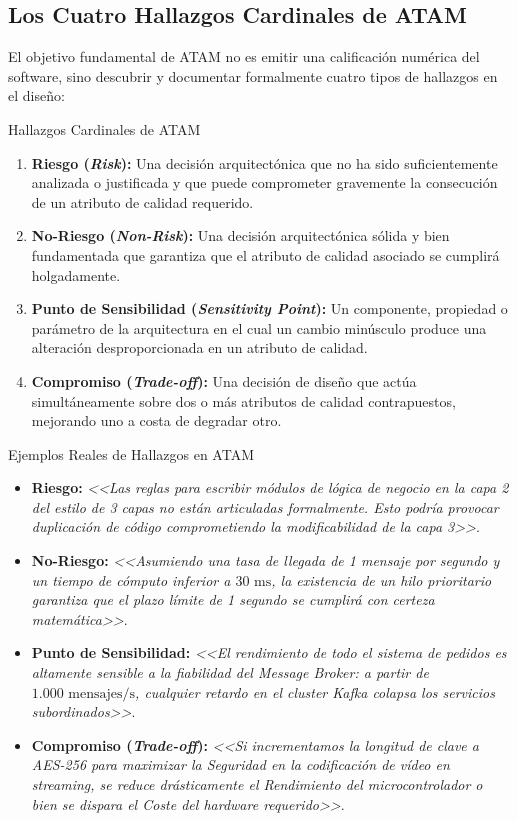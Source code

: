 \subsection{Los Cuatro Hallazgos Cardinales de ATAM}

El objetivo fundamental de ATAM no es emitir una calificación numérica del software, sino descubrir y documentar formalmente cuatro tipos de hallazgos en el diseño:

\begin{definicion}{Hallazgos Cardinales de ATAM}
\begin{enumerate}[leftmargin=1.5em]
  \item \textbf{Riesgo (\emph{Risk}):} Una decisión arquitectónica que no ha sido suficientemente analizada o justificada y que puede comprometer gravemente la consecución de un atributo de calidad requerido.
  \item \textbf{No-Riesgo (\emph{Non-Risk}):} Una decisión arquitectónica sólida y bien fundamentada que garantiza que el atributo de calidad asociado se cumplirá holgadamente.
  \item \textbf{Punto de Sensibilidad (\emph{Sensitivity Point}):} Un componente, propiedad o parámetro de la arquitectura en el cual un cambio minúsculo produce una alteración desproporcionada en un atributo de calidad.
  \item \textbf{Compromiso (\emph{Trade-off}):} Una decisión de diseño que actúa simultáneamente sobre dos o más atributos de calidad contrapuestos, mejorando uno a costa de degradar otro.
\end{enumerate}
\end{definicion}

\begin{ejemplo}{Ejemplos Reales de Hallazgos en ATAM}
\begin{itemize}[leftmargin=1.5em]
  \item \textbf{Riesgo:} \emph{<<Las reglas para escribir módulos de lógica de negocio en la capa 2 del estilo de 3 capas no están articuladas formalmente. Esto podría provocar duplicación de código comprometiendo la modificabilidad de la capa 3>>}.
  \item \textbf{No-Riesgo:} \emph{<<Asumiendo una tasa de llegada de 1 mensaje por segundo y un tiempo de cómputo inferior a $30\text{ ms}$, la existencia de un hilo prioritario garantiza que el plazo límite de 1 segundo se cumplirá con certeza matemática>>}.
  \item \textbf{Punto de Sensibilidad:} \emph{<<El rendimiento de todo el sistema de pedidos es altamente sensible a la fiabilidad del Message Broker: a partir de $1.000\text{ mensajes/s}$, cualquier retardo en el cluster Kafka colapsa los servicios subordinados>>}.
  \item \textbf{Compromiso (\emph{Trade-off}):} \emph{<<Si incrementamos la longitud de clave a AES-256 para maximizar la Seguridad en la codificación de vídeo en streaming, se reduce drásticamente el Rendimiento del microcontrolador o bien se dispara el Coste del hardware requerido>>}.
\end{itemize}
\end{ejemplo}

